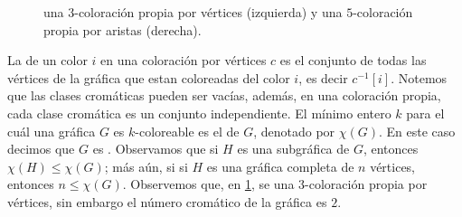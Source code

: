 \begin{figure}[ht!]
    \centering
    \caption{una $3$-coloraci\'on propia por v\'ertices (izquierda) y una 
        $5$-coloraci\'on propia por aristas (derecha).}
        \label{fig:ex-color-prop}
\end{figure}

La  de un color $i$ en una coloraci\'on por v\'ertices
$c$ es el conjunto de todas las v\'ertices de la gr\'afica que estan coloreadas
del color $i$, es decir $c^{-1}[i]$. Notemos que las clases crom\'aticas pueden
ser vac\'ias, adem\'as, en una coloraci\'on propia, cada clase crom\'atica es un
conjunto independiente. El m\'inimo entero $k$ para el cu\'al una gr\'afica $G$
es $k$-coloreable es el  de $G$, denotado por
$\chi(G)$. En este caso decimos que $G$ es
. Observamos que si $H$ es una
subgr\'afica de $G$, entonces $\chi(H) \leq \chi(G)$; m\'as a\'un, si si $H$ es
una gr\'afica completa de $n$ v\'ertices, entonces $n \leq \chi(G)$. Observemos
que, en \cref{fig:ex-color-prop}, se una $3$-coloraci\'on propia por
v\'ertices, sin embargo el n\'umero crom\'atico de la gr\'afica es $2$.

